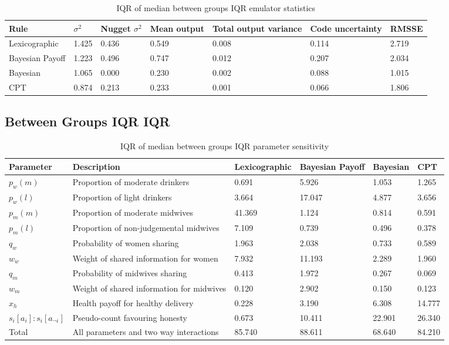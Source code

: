 \begin{table}[H]
\caption{IQR of median between groups IQR emulator statistics \label{tab:sa_emulator_sig_iqr}}
\begin{tabular} {jjjjjjj}
\hline
Rule & \(\sigma^2\) & Nugget \(\sigma^2\) & Mean output & Total output variance & Code uncertainty & RMSSE \\ \hline
Lexicographic & 1.425 & 0.436 & 0.549 & 0.008 & 0.114 & 2.719 \\ \hline
Bayesian Payoff & 1.223 & 0.496 & 0.747 & 0.012 & 0.207 & 2.034 \\ \hline
Bayesian &  1.065 & 0.000 & 0.230 & 0.002 & 0.088 & 1.015 \\ \hline
\ac{CPT} & 0.874 & 0.213 & 0.233 & 0.001 & 0.066 & 1.806 \\ \hline
\end{tabular}
\end{table}



\subsection{Between Groups IQR IQR}

\begin{table}[H]
\caption{IQR of median between groups IQR parameter sensitivity \label{tab:sa_results_iqr_iqr}}
\begin{tabular} {jjjjjj}
\hline
Parameter & Description & Lexicographic & Bayesian Payoff & Bayesian & \ac{CPT} \\ \hline
\(p_{w}(m)\) & Proportion of moderate drinkers & 0.691 & 5.926 & 1.053 & 1.265 \\ \hline
\(p_{w}(l)\) & Proportion of light drinkers & 3.664 & 17.047 & 4.877 & 3.656 \\ \hline
\(p_{m}(m)\) & Proportion of moderate midwives & 41.369 & 1.124 & 0.814 & 0.591 \\ \hline
\(p_{m}(l)\) & Proportion of non-judgemental midwives & 7.109 & 0.739 & 0.496 & 0.378 \\ \hline
\(q_{w}\) & Probability of women sharing & 1.963 & 2.038 & 0.733 & 0.589 \\ \hline
\(w_{w}\) & Weight of shared information for women & 7.932 & 11.193 & 2.289 & 1.960 \\ \hline
\(q_{m}\) & Probability of midwives sharing & 0.413 & 1.972 & 0.267 & 0.069\\ \hline
\(w_{m}\) & Weight of shared information for midwives & 0.120 & 2.902 & 0.150 & 0.123 \\ \hline
\(x_{h}\) & Health payoff for healthy delivery & 0.228 & 3.190 & 6.308 & 14.777 \\ \hline
\(s_{i}[a_{i}]:s_{i}[a_{\neg i}]\) & Pseudo-count favouring honesty & 0.673 & 10.411 & 22.901 & 26.340 \\ \hline
Total & All parameters and two way interactions & 85.740 & 88.611 & 68.640 & 84.210 \\ \hline
\end{tabular}
\end{table}


